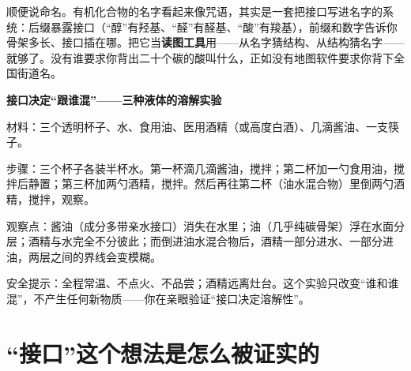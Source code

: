 顺便说命名。有机化合物的名字看起来像咒语，其实是一套把接口写进名字的系统：后缀暴露接口（“醇”有羟基、“醛”有醛基、“酸”有羧基），前缀和数字告诉你骨架多长、接口插在哪。把它当\textbf{读图工具}用——从名字猜结构、从结构猜名字——就够了。没有谁要求你背出二十个碳的酸叫什么，正如没有地图软件要求你背下全国街道名。

\begin{shiyan}
\textbf{接口决定“跟谁混”——三种液体的溶解实验}

材料：三个透明杯子、水、食用油、医用酒精（或高度白酒）、几滴酱油、一支筷子。

步骤：三个杯子各装半杯水。第一杯滴几滴酱油，搅拌；第二杯加一勺食用油，搅拌后静置；第三杯加两勺酒精，搅拌。然后再往第二杯（油水混合物）里倒两勺酒精，搅拌，观察。

观察点：酱油（成分多带亲水接口）消失在水里；油（几乎纯碳骨架）浮在水面分层；酒精与水完全不分彼此；而倒进油水混合物后，酒精一部分进水、一部分进油，两层之间的界线会变模糊。

安全提示：全程常温、不点火、不品尝；酒精远离灶台。这个实验只改变“谁和谁混”，不产生任何新物质——你在亲眼验证“接口决定溶解性”。
\end{shiyan}

\section{“接口”这个想法是怎么被证实的}

